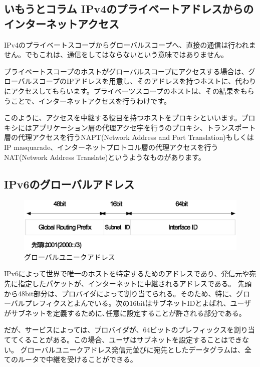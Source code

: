 \subsection*{いもうとコラム IPv4のプライベートアドレスからのインターネットアクセス}
IPv4のプライベートスコープからグローバルスコープへ、直接の通信は行われません。でもこれは、通信をしてはならないという意味ではありません。

プライベートスコープのホストがグローバルスコープにアクセスする場合は、グローバルスコープのIPアドレスを用意し、そのアドレスを持つホストに、代わりにアクセスしてもらいます。プライベーツスコープのホストは、その結果をもらうことで、インターネットアクセスを行うわけです。

このように、アクセスを中継する役目を持つホストをプロキシといいます。プロキシにはアプリケーション層の代理アクセ宇を行うのプロキシ、トランスポート層の代理アクセスを行うNAPT(Network Address and Port Translation)もしくはIP masquarade、インターネットプロトコル層の代理アクセスを行うNAT(Network Address Translate)というようなものがあります。

\subsection{IPv6のグローバルアドレス}

\begin{figure}[htbp]
	\includegraphics[width=12cm,clip]{draw/gua.eps}
	\caption{グローバルユニークアドレス}
	\label{fig:gua}
\end{figure}


IPv6によって世界で唯一のホストを特定するためのアドレスであり、発信元や宛先に指定したパケットが、インターネットに中継されるアドレスである。
先頭から48bit部分は、プロバイダによって割り当てられる。そのため、特に、グローバルプレフィクスとよんでいる。次の16bitはサブネットIDとよばれ、ユーザがサブネットを定義するために､任意に設定することが許される部分である。

だが、サービスによっては、プロバイダが、64ビットのプレフィックスを割り当ててくることがある。この場合、ユーザはサブネットを設定することはできない。
グローバルユニークアドレス発信元並びに宛先としたデータグラムは、全てのルータで中継を受けることができる。


